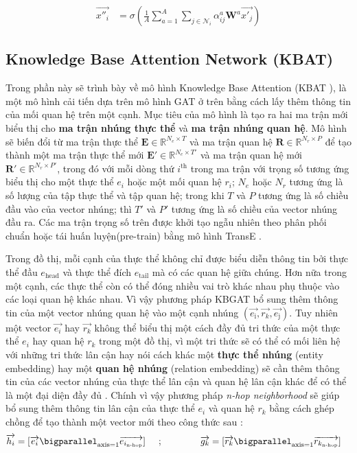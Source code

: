 \begin{align}
{\overrightarrow{x''_i}}&={\sigma\left(\frac{1}{A} \sum_{a=1}^{A}\sum_{j\in \mathcal{N}_i}\alpha_{ij}^{a} \mathbf{W}^{a} \overrightarrow{x'_{j}} \right)}
\end{align}

\subsection{Knowledge Base Attention Network (KBAT)}

Trong phần này sẽ trình bày về mô hình Knowledge Base Attention (KBAT \cite{nathani2019learning}), là một mô hình cải tiến dựa trên mô hình GAT ở trên bằng cách lấy thêm thông tin của mối quan hệ trên một cạnh. Mục tiêu của mô hình là tạo ra hai ma trận mới biểu thị cho \textbf{ma trận nhúng thực thể} và \textbf{ma trận nhúng quan hệ}. Mô hình sẽ biến đổi từ ma trận thực thể $\mathbf{E} \in \mathbb{R}^{N_e \times T}$ và ma trận quan hệ $\mathbf{R} \in \mathbb{R}^{N_r \times P}$ để tạo thành một ma trận thực thể mới $\mathbf{E'} \in \mathbb{R}^{N_e \times T'}$ và ma trận quan hệ mới $\mathbf{R'} \in \mathbb{R}^{N_r \times P'}$, trong đó với mỗi dòng thứ $i^{\text{th}}$ trong ma trận với trọng số tương ứng biểu thị cho một thực thể $e_i$ hoặc một mối quan hệ $r_i$; $N_e$ hoặc $N_r$ tương ứng là số lượng của tập thực thể và tập quan hệ; trong khi $T$ và $P$ tương ứng là số chiều đầu vào của vector nhúng; thì $T'$ và $P'$ tương ứng là số chiều của vector nhúng đầu ra. Các ma trận trọng số trên được khởi tạo ngẫu nhiên theo phân phối chuẩn hoặc tái huấn luyện(pre-train) bằng mô hình TransE \cite{bordes2013translating} .

Trong đồ thị, mỗi cạnh của thực thể không chỉ được biểu diễn thông tin bởi thực thể đầu $e_\text{head}$ và thực thể đích $e_\text{tail}$ mà có các quan hệ giữa chúng. Hơn nữa trong một cạnh, các thực thể còn có thể đóng nhiều vai trò khác nhau phụ thuộc vào các loại quan hệ khác nhau. Vì vậy phương pháp KBGAT bổ sung thêm thông tin của một vector nhúng quan hệ vào một cạnh  nhúng $(\overrightarrow{e_\text{i}}, \overrightarrow{r_k}, \overrightarrow{e_\text{j}})$. Tuy nhiên một vector $\overrightarrow{e_i}$ hay $\overrightarrow{r_k}$ không thể biểu thị một cách đầy đủ tri thức của một thực thể $e_i$ hay quan hệ $r_k$ trong một đồ thị, vì một tri thức sẽ có thể có mối liên hệ với những tri thức lân cận hay nói cách khác một \textbf{thực thể nhúng} (entity embedding) hay một \textbf{quan hệ nhúng} (relation embedding) sẽ cần thêm thông tin của các vector nhúng của thực thể lân cận và quan hệ lân cận khác để có thể là một đại diện đầy đủ . Chính vì vậy phương pháp \textit{n-hop neighborhood} \cite{lin2018multi} sẽ giúp bổ sung thêm thông tin lân cận của thực thể $e_i$ và quan hệ $r_k$ bằng cách ghép chồng để tạo thành một vector mới theo công thức sau :
\begin{align}
{\overrightarrow{h_i} = [\overrightarrow{e_i} \bigparallel_{\text{axis}=1} \overrightarrow{e_{i_{\text{n-hop}}}}]} \hspace{0.5cm};\hspace{1.5cm}&
{\overrightarrow{g_k} = [\overrightarrow{r_k} \bigparallel_{\text{axis}=1} \overrightarrow{r_{k_{\text{n-hop}}}}]}
\end{align}

